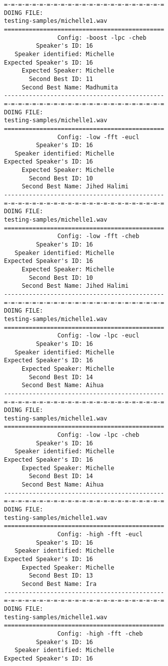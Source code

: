 \begin{verbatim}
=-=-=-=-=-=-=-=-=-=-=-=-=-=-=-=-=-=-=-=-=-=-=
DOING FILE:
testing-samples/michelle1.wav
=============================================
               Config: -boost -lpc -cheb
         Speaker's ID: 16
   Speaker identified: Michelle
Expected Speaker's ID: 16
     Expected Speaker: Michelle
       Second Best ID: 11
     Second Best Name: Madhumita
---------------------------------------------
=-=-=-=-=-=-=-=-=-=-=-=-=-=-=-=-=-=-=-=-=-=-=
DOING FILE:
testing-samples/michelle1.wav
=============================================
               Config: -low -fft -eucl
         Speaker's ID: 16
   Speaker identified: Michelle
Expected Speaker's ID: 16
     Expected Speaker: Michelle
       Second Best ID: 10
     Second Best Name: Jihed Halimi
---------------------------------------------
=-=-=-=-=-=-=-=-=-=-=-=-=-=-=-=-=-=-=-=-=-=-=
DOING FILE:
testing-samples/michelle1.wav
=============================================
               Config: -low -fft -cheb
         Speaker's ID: 16
   Speaker identified: Michelle
Expected Speaker's ID: 16
     Expected Speaker: Michelle
       Second Best ID: 10
     Second Best Name: Jihed Halimi
---------------------------------------------
=-=-=-=-=-=-=-=-=-=-=-=-=-=-=-=-=-=-=-=-=-=-=
DOING FILE:
testing-samples/michelle1.wav
=============================================
               Config: -low -lpc -eucl
         Speaker's ID: 16
   Speaker identified: Michelle
Expected Speaker's ID: 16
     Expected Speaker: Michelle
       Second Best ID: 14
     Second Best Name: Aihua
---------------------------------------------
=-=-=-=-=-=-=-=-=-=-=-=-=-=-=-=-=-=-=-=-=-=-=
DOING FILE:
testing-samples/michelle1.wav
=============================================
               Config: -low -lpc -cheb
         Speaker's ID: 16
   Speaker identified: Michelle
Expected Speaker's ID: 16
     Expected Speaker: Michelle
       Second Best ID: 14
     Second Best Name: Aihua
---------------------------------------------
=-=-=-=-=-=-=-=-=-=-=-=-=-=-=-=-=-=-=-=-=-=-=
DOING FILE:
testing-samples/michelle1.wav
=============================================
               Config: -high -fft -eucl
         Speaker's ID: 16
   Speaker identified: Michelle
Expected Speaker's ID: 16
     Expected Speaker: Michelle
       Second Best ID: 13
     Second Best Name: Ira
---------------------------------------------
=-=-=-=-=-=-=-=-=-=-=-=-=-=-=-=-=-=-=-=-=-=-=
DOING FILE:
testing-samples/michelle1.wav
=============================================
               Config: -high -fft -cheb
         Speaker's ID: 16
   Speaker identified: Michelle
Expected Speaker's ID: 16

\end{verbatim}
